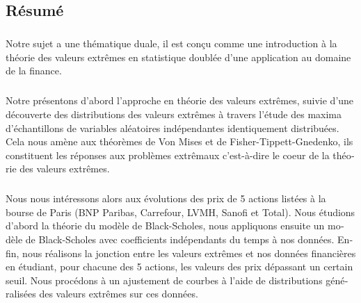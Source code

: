 \begin{otherlanguage}{french}
\cleardoublepage
\chapter*{Résumé}
\bigskip
\paragraph{}
Notre sujet a une thématique duale, il est con\c cu comme une introduction à la théorie des valeurs extrêmes en statistique doublée d'une application au domaine de la finance.
\paragraph{}
Notre présentons d'abord l'approche en théorie des valeurs extrêmes, suivie d'une découverte des distributions des valeurs extrêmes à travers l'étude des maxima d'échantillons de variables aléatoires indépendantes identiquement distribuées. Cela nous amène aux théorèmes de Von Mises et de Fisher-Tippett-Gnedenko, ils constituent les réponses aux problèmes extrêmaux c'est-à-dire le coeur de la théorie des valeurs extrêmes.
\paragraph{}
Nous nous intéressons alors aux évolutions des prix de 5 actions listées à la bourse de Paris (BNP Paribas, Carrefour, LVMH, Sanofi et Total). Nous étudions d'abord la théorie du modèle de Black-Scholes, nous appliquons ensuite un modèle de Black-Scholes avec coefficients indépendants du temps à nos données. Enfin, nous réalisons la jonction entre les valeurs extrêmes et nos données financières en étudiant, pour chacune des 5 actions, les valeurs des prix dépassant un certain seuil. Nous procédons à un ajustement de courbes à l'aide de distributions généralisées des valeurs extrêmes sur ces données.
\vskip0.5cm
\end{otherlanguage}


